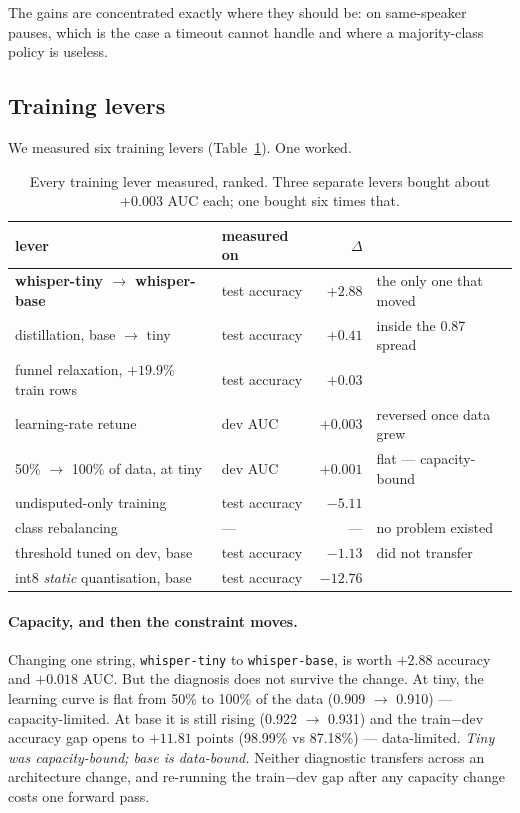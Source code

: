 \documentclass[11pt]{article}
\newcommand{\pct}{\%}
\begin{document}
The gains are concentrated exactly where they should be: on same-speaker pauses,
which is the case a timeout cannot handle and where a majority-class policy is
useless.

\subsection{Training levers}

We measured six training levers (Table~\ref{tab:levers}). One worked.

\begin{table}[h]
\centering\small
\begin{tabular}{llr l}
\toprule
lever & measured on & $\Delta$ & \\
\midrule
\textbf{whisper-tiny $\rightarrow$ whisper-base} & test accuracy & $\mathbf{+2.88}$ & the only one that moved \\
distillation, base $\rightarrow$ tiny & test accuracy & $+0.41$ & inside the 0.87 spread \\
funnel relaxation, $+19.9\pct$ train rows & test accuracy & $+0.03$ & \\
learning-rate retune & dev AUC & $+0.003$ & reversed once data grew \\
50\pct{} $\rightarrow$ 100\pct{} of data, at tiny & dev AUC & $+0.001$ & flat --- capacity-bound \\
\midrule
undisputed-only training & test accuracy & $-5.11$ & \\
class rebalancing & --- & --- & no problem existed \\
threshold tuned on dev, base & test accuracy & $-1.13$ & did not transfer \\
int8 \emph{static} quantisation, base & test accuracy & $-12.76$ & \\
\bottomrule
\end{tabular}
\caption{Every training lever measured, ranked. Three separate levers bought
about $+0.003$ AUC each; one bought six times that.}
\label{tab:levers}
\end{table}

\paragraph{Capacity, and then the constraint moves.} Changing one string,
\texttt{whisper-tiny} to \texttt{whisper-base}, is worth $+2.88$ accuracy and
$+0.018$ AUC. But the diagnosis does not survive the change. At tiny, the
learning curve is flat from 50\pct{} to 100\pct{} of the data (0.909
$\rightarrow$ 0.910) --- capacity-limited. At base it is still rising (0.922
$\rightarrow$ 0.931) and the train$-$dev accuracy gap opens to $+11.81$ points
(98.99\pct{} vs 87.18\pct{}) --- data-limited. \emph{Tiny was capacity-bound;
base is data-bound.} Neither diagnostic transfers across an architecture change,
and re-running the train$-$dev gap after any capacity change costs one forward
pass.
\end{document}
